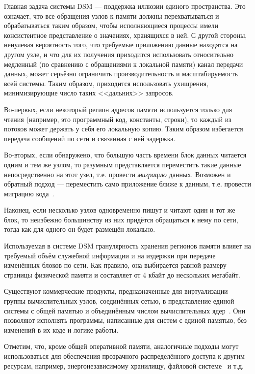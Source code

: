 \begin{itemize*}
    \item Главная задача системы DSM --- поддержка иллюзии единого пространства. Это означает, что все обращения узлов к памяти должны перехватываться и обрабатываться таким образом, чтобы исполняющиеся процессы имели консистентное представление о значениях, хранящихся в ней. С другой стороны, ненулевая вероятность того, что требуемые приложению данные находятся на другом узле, и что для их получения приходится использовать относительно медленный (по сравнению с обращениями к локальной памяти) канал передачи данных, может серьёзно ограничить производительность и масштабируемость всей системы. Таким образом, приходится использовать ухищрения, минимизирующие число таких <<дальних>> запросов.
    \item Во-первых, если некоторый регион адресов памяти используется только для чтения (например, это программный код, константы, строки), то каждый из потоков может держать у себя его локальную копию. Таким образом избегается передача сообщений по сети и связанная с ней задержка.
    \item Во-вторых, если обнаружено, что большую часть времени блок данных читается одним и тем же узлом, то разумным представляется переместить такие данные непосредственно на этот узел, т.е. провести \textit{миграцию} данных. Возможен и обратный подход --- переместить само приложение ближе к данным, т.е. провести миграцию кода~\cite{em2-migration}.
    \item Наконец, если несколько узлов одновременно пишут и читают один и тот же блок, то неизбежно большинству из них придётся  обращаться к нему по сети, тогда как для одного он будет размещён локально.
    \item Используемая в системе DSM гранулярность хранения регионов памяти влияет на требуемый объём служебной информации и на издержки при передаче изменённых блоков по сети. Как правило, она выбирается равной размеру страницы физической памяти и составляет от 4 кбайт до нескольких мегабайт.
\end{itemize*}

Существуют коммерческие продукты, предназначенные для виртуализации группы вычислительных узлов, соединённых сетью, в представление единой системы с общей памятью и объединённым числом вычислительных ядер~\cite{vsmp-foundation-free, sgi-uv}. Они позволяют исполнять программы, написанные для систем с единой памятью, без изменений в их коде и логике работы.

Отметим, что, кроме общей оперативной памяти,  аналогичные подходы могут использоваться для обеспечения прозрачного распределённого доступа к другим ресурсам, например, энергонезависимому хранилищу, файловой системе~\cite{gpfs2002, lustrefs} и т.д.

